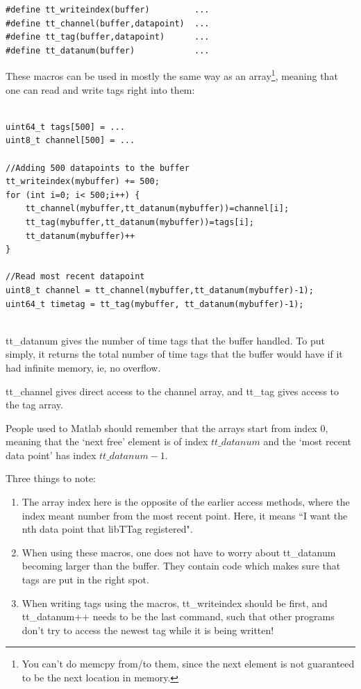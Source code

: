 \documentclass[10pt]{article}
\begin{document}
\begin{verbatim}
#define tt_writeindex(buffer)         ...
#define tt_channel(buffer,datapoint)  ...
#define tt_tag(buffer,datapoint)      ...
#define tt_datanum(buffer)            ...
\end{verbatim}

These macros can be used in mostly
the same way as an array\footnote{You can't do memcpy from/to them, since the next element is not 
guaranteed to be the next location in memory.}, meaning that one can read and write tags right
into them:

\begin{verbatim}

uint64_t tags[500] = ...
uint8_t channel[500] = ...

//Adding 500 datapoints to the buffer
tt_writeindex(mybuffer) += 500;
for (int i=0; i< 500;i++) {
    tt_channel(mybuffer,tt_datanum(mybuffer))=channel[i];
    tt_tag(mybuffer,tt_datanum(mybuffer))=tags[i];
    tt_datanum(mybuffer)++
}

//Read most recent datapoint
uint8_t channel = tt_channel(mybuffer,tt_datanum(mybuffer)-1);
uint64_t timetag = tt_tag(mybuffer, tt_datanum(mybuffer)-1);


\end{verbatim}

tt\_datanum gives the number of time tags that the buffer handled. To put simply, it returns
the total number of time tags that the buffer would have if it had infinite memory, ie, no overflow.

tt\_channel gives direct access to the channel array, and tt\_tag gives access to the tag array.

People used to Matlab should remember that
the arrays start from index 0, meaning that the `next free' element is of index $tt\_datanum$ and
the `most recent data point' has index $tt\_datanum-1$.

Three things to note: 
\begin{enumerate}
\item The array index here is the opposite of the earlier access methods, where the index meant
number from the most recent point. Here, it means ``I want the nth data point that libTTag registered".

\item When using these macros, one does not have to worry about tt\_datanum becoming larger than the buffer.
They contain code which makes sure that tags are put in the right spot. 

\item When writing tags using the macros, tt\_writeindex should be first, and tt\_datanum++ needs to be the last command, such that other
programs don't try to access the newest tag while it is being written!

\end{enumerate}
\end{document}
